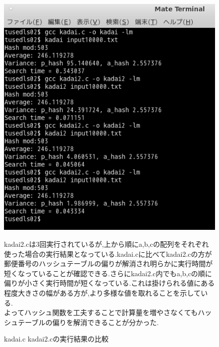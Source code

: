 \documentclass{jsarticle}
\begin{document}
\begin{figure}[!htbp]
\begin{center}
\includegraphics[width=150mm]{4.png}
\caption{kadai.c kadai2.cの実行結果の比較}
\end{center}
kadai2.cは3回実行されているが,上から順にa,b,cの配列をそれぞれ使った場合の実行結果となっている.kadai.cに比べてkadai2.cの方が郵便番号のハッシュテーブルの偏りが解消され明らかに実行時間が短くなっていることが確認できる.さらにkadai2.c内でもa,b,cの順に偏りが小さく実行時間が短くなっている.これは掛けられる値にある程度大きさの幅がある方が,より多様な値を取れることを示している.\\
よってハッシュ関数を工夫することで計算量を増やさなくてもハッシュテーブルの偏りを解消できることが分かった.
\end{figure}
\end{document}
